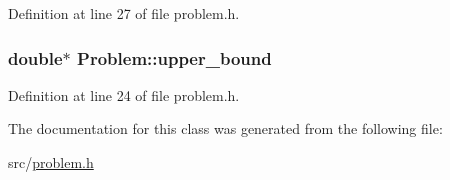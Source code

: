 Definition at line 27 of file problem.\+h.

\hypertarget{class_problem_a02bd6d1e098e211cc3bf0f5e02f20133}{}
\subsubsection[{upper\+\_\+bound}]{\setlength{\rightskip}{0pt plus 5cm}double$\ast$ Problem\+::upper\+\_\+bound}\label{class_problem_a02bd6d1e098e211cc3bf0f5e02f20133}


Definition at line 24 of file problem.\+h.



The documentation for this class was generated from the following file\+:\begin{DoxyCompactItemize}
\item 
src/\hyperlink{problem_8h}{problem.\+h}\end{DoxyCompactItemize}
